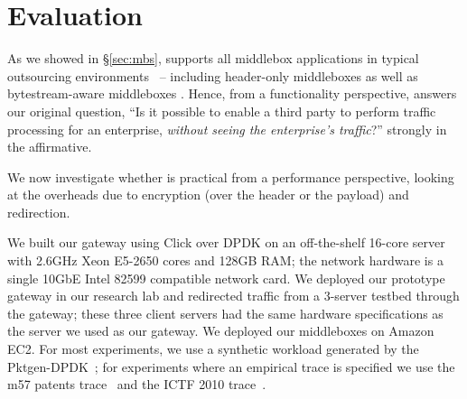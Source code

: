 \section{Evaluation} \label{sec:eval}

As we showed in \S\ref{sec:mbs}, \sys supports all middlebox applications in typical outsourcing environments~\cite{aplomb,nfv} -- including header-only middleboxes as well as bytestream-aware middleboxes . 
Hence, from a functionality perspective, \sys answers our original question, ``Is it possible to enable a third party to perform traffic processing for an enterprise, {\em without seeing the enterprise's traffic}?''  strongly in the affirmative.

We now investigate whether \sys is practical from a performance perspective, looking at the overheads due to encryption (over the header or the payload) and redirection. 

We built our gateway using Click over DPDK on an off-the-shelf 16-core server with 2.6GHz Xeon E5-2650 cores and 128GB RAM; the network hardware is a single 10GbE Intel 82599 compatible network card. 
We deployed our prototype gateway in our research lab and redirected traffic from a 3-server testbed through the gateway; these three client servers had the same hardware specifications as the server we used as our gateway.
We deployed our middleboxes on Amazon EC2.
For most experiments, we use a synthetic workload generated by the Pktgen-DPDK~\cite{pktgen}; for experiments where an empirical trace is specified we use the m57 patents trace~\cite{m57} and the ICTF 2010 trace~\cite{ictf}.


